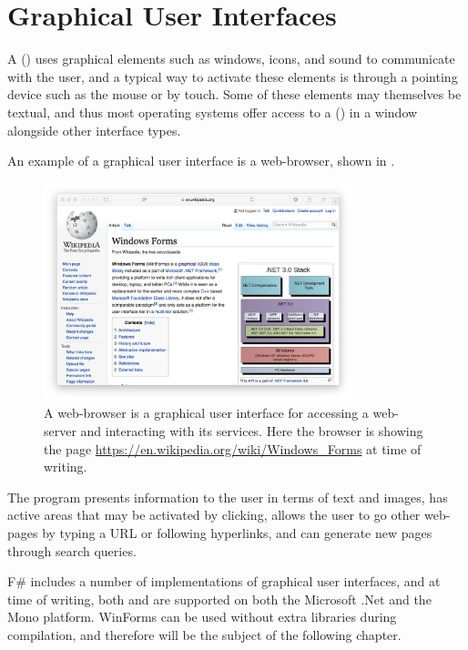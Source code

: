\documentclass[fsharpnotes.tex]{subfiles}
\begin{document}
\chapter{Graphical User Interfaces}
\label{chap:windows}

A  () uses graphical elements such as windows, icons, and sound to communicate with the user, and a typical way to activate these elements is through a pointing device such as the mouse or by touch. Some of these elements may themselves be textual, and thus most operating systems offer access to a  () in a window alongside other interface types.

An example of a graphical user interface is a web-browser, shown in .
\begin{figure}
  \centering
  \includegraphics[width=0.8\textwidth]{safariWinForms}
  \caption{A web-browser is a graphical user interface for accessing a web-server and interacting with its services. Here the browser is showing the page \url{https://en.wikipedia.org/wiki/Windows_Forms} at time of writing.}
  \label{fig:safariGui}
\end{figure}
The program presents information to the user in terms of text and images, has active areas that may be activated by clicking, allows the user to go other web-pages by typing a URL or following hyperlinks, and can generate new pages through search queries.

F\# includes a number of implementations of graphical user interfaces, and at time of writing, both  and  are supported on both the Microsoft .Net and the Mono platform. WinForms can be used without extra libraries during compilation, and therefore will be the subject of the following chapter.
\end{document}
